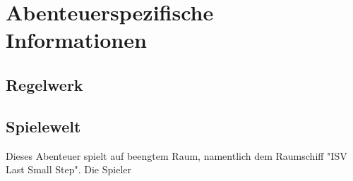 
\section*{Abenteuerspezifische Informationen}

\subsection*{Regelwerk}
\label{ssec:rules}



\subsection*{Spielewelt}
\label{ssec:world}

Dieses Abenteuer spielt auf beengtem Raum, namentlich dem Raumschiff "ISV Last Small Step".
Die Spieler 
